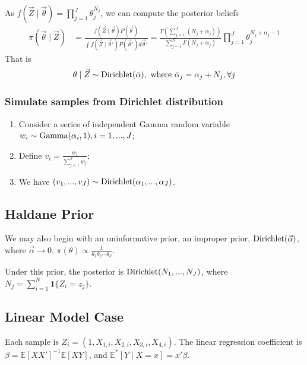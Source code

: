 \documentclass[11pt]{elegantbook}
\begin{document}
As $f(\vec{Z}\mid\vec{\theta})=\prod_{j=1}^J\theta_j^{N_j}$, we can compute the posterior beliefs
\begin{equation}
    \begin{aligned}
        \pi(\vec{\theta}\mid \vec{Z})&=\frac{f(\vec{Z}\mid \vec{\theta})P(\vec{\theta})}{\int f(\vec{Z}\mid \vec{\theta}')P(\vec{\theta}')d\vec{\theta}'}=\frac{\Gamma(\sum_{j=1}^J (N_j+\alpha_j))}{\sum_{j=1}^N\Gamma(N_j+\alpha_j)}\prod_{j=1}^J\theta_j^{N_j+\alpha_j-1}
    \end{aligned}
    \nonumber
\end{equation}
That is
\begin{equation}
    \begin{aligned}
        \theta\mid\vec{Z}\sim \textnormal{Dirichlet}(\bar{\alpha}), \textnormal{ where }\bar{\alpha}_j=\alpha_j+N_j, \forall j
    \end{aligned}
    \nonumber
\end{equation}
\subsubsection*{Simulate samples from Dirichlet distribution}
\begin{definition}
    \normalfont
    \begin{enumerate}[1.]
        \item Consider a series of independent Gamma random variable $w_i\sim \textnormal{Gamma}(\alpha_i,1), i=1,...,J$;
        \item Define $v_i=\frac{w_i}{\sum_{j=1}^J w_j}$;
        \item We have $(v_1,...,v_J)\sim \textnormal{Dirichlet}(\alpha_1,...,\alpha_J)$.
    \end{enumerate}
\end{definition}

\subsection{Haldane Prior}
We may also begin with an uninformative prior, an improper prior, $\textnormal{Dirichlet}(\vec{\alpha})$, where $\vec{\alpha} \rightarrow 0$. $\pi(\theta)\varpropto \frac{1}{\theta_1\theta_2\cdots\theta_J}$.

Under this prior, the posterior is $\textnormal{Dirichlet}(N_1,...,N_J)$, where $N_j=\sum_{i=1}^N \mathbf{1}\{Z_i=z_j\}$.

\subsection{Linear Model Case}
Each sample is $Z_i=(1,X_{1,i},X_{2,i},X_{3,i},X_{4,i})$. The linear regression coefficient is $\beta=\mathbb{E}[XX']^{-1}\mathbb{E}[XY]$, and $\mathbb{E}^*[Y\mid X=x]=x'\beta$.
\end{document}
